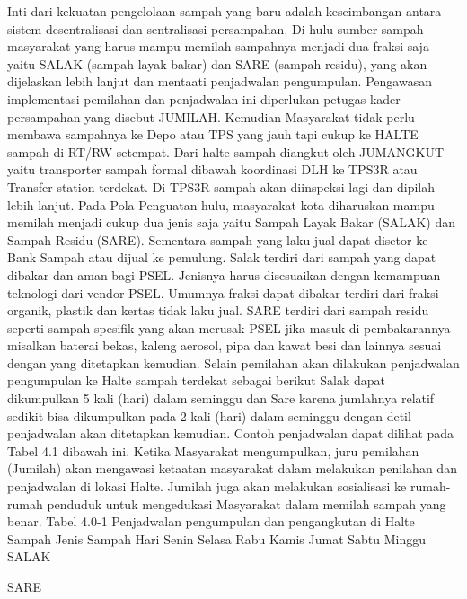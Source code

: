 \documentclass[
  letterpaper,
  DIV=11,
  numbers=noendperiod]{scrreprt}
\begin{document}
Inti dari kekuatan pengelolaan sampah yang baru adalah keseimbangan
antara sistem desentralisasi dan sentralisasi persampahan. Di hulu
sumber sampah masyarakat yang harus mampu memilah sampahnya menjadi dua
fraksi saja yaitu SALAK (sampah layak bakar) dan SARE (sampah residu),
yang akan dijelaskan lebih lanjut dan mentaati penjadwalan pengumpulan.
Pengawasan implementasi pemilahan dan penjadwalan ini diperlukan petugas
kader persampahan yang disebut JUMILAH. Kemudian Masyarakat tidak perlu
membawa sampahnya ke Depo atau TPS yang jauh tapi cukup ke HALTE sampah
di RT/RW setempat. Dari halte sampah diangkut oleh JUMANGKUT yaitu
transporter sampah formal dibawah koordinasi DLH ke TPS3R atau Transfer
station terdekat. Di TPS3R sampah akan diinspeksi lagi dan dipilah lebih
lanjut. Pada Pola Penguatan hulu, masyarakat kota diharuskan mampu
memilah menjadi cukup dua jenis saja yaitu Sampah Layak Bakar (SALAK)
dan Sampah Residu (SARE). Sementara sampah yang laku jual dapat disetor
ke Bank Sampah atau dijual ke pemulung. Salak terdiri dari sampah yang
dapat dibakar dan aman bagi PSEL. Jenisnya harus disesuaikan dengan
kemampuan teknologi dari vendor PSEL. Umumnya fraksi dapat dibakar
terdiri dari fraksi organik, plastik dan kertas tidak laku jual. SARE
terdiri dari sampah residu seperti sampah spesifik yang akan merusak
PSEL jika masuk di pembakarannya misalkan baterai bekas, kaleng aerosol,
pipa dan kawat besi dan lainnya sesuai dengan yang ditetapkan kemudian.
Selain pemilahan akan dilakukan penjadwalan pengumpulan ke Halte sampah
terdekat sebagai berikut Salak dapat dikumpulkan 5 kali (hari) dalam
seminggu dan Sare karena jumlahnya relatif sedikit bisa dikumpulkan pada
2 kali (hari) dalam seminggu dengan detil penjadwalan akan ditetapkan
kemudian. Contoh penjadwalan dapat dilihat pada Tabel 4.1 dibawah ini.
Ketika Masyarakat mengumpulkan, juru pemilahan (Jumilah) akan mengawasi
ketaatan masyarakat dalam melakukan penilahan dan penjadwalan di lokasi
Halte. Jumilah juga akan melakukan sosialisasi ke rumah-rumah penduduk
untuk mengedukasi Masyarakat dalam memilah sampah yang benar. Tabel
4.0-1 Penjadwalan pengumpulan dan pengangkutan di Halte Sampah Jenis
Sampah Hari Senin Selasa Rabu Kamis Jumat Sabtu Minggu SALAK

SARE
\end{document}
